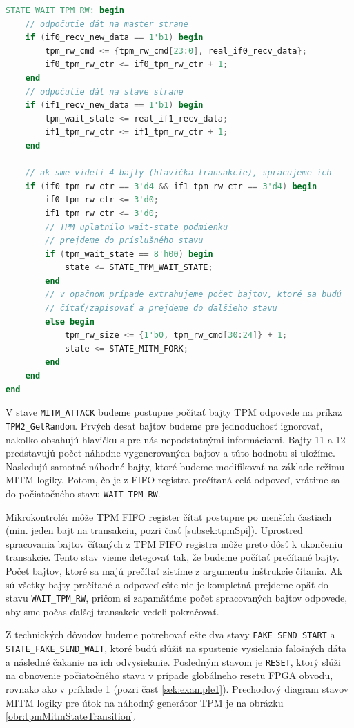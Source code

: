 \begin{lstlisting}[float,language=Verilog,caption={Logika stavu \texttt{WAIT\_TPM\_RW}.},label=snip:tpmRwState]
STATE_WAIT_TPM_RW: begin
    // odpočutie dát na master strane
    if (if0_recv_new_data == 1'b1) begin
        tpm_rw_cmd <= {tpm_rw_cmd[23:0], real_if0_recv_data};
        if0_tpm_rw_ctr <= if0_tpm_rw_ctr + 1;
    end
    // odpočutie dát na slave strane
    if (if1_recv_new_data == 1'b1) begin
        tpm_wait_state <= real_if1_recv_data;
        if1_tpm_rw_ctr <= if1_tpm_rw_ctr + 1;
    end
    
    // ak sme videli 4 bajty (hlavička transakcie), spracujeme ich
    if (if0_tpm_rw_ctr == 3'd4 && if1_tpm_rw_ctr == 3'd4) begin
        if0_tpm_rw_ctr <= 3'd0;
        if1_tpm_rw_ctr <= 3'd0;
        // TPM uplatnilo wait-state podmienku
        // prejdeme do príslušného stavu
        if (tpm_wait_state == 8'h00) begin
            state <= STATE_TPM_WAIT_STATE;
        end
        // v opačnom prípade extrahujeme počet bajtov, ktoré sa budú
        // čítať/zapisovať a prejdeme do ďalšieho stavu
        else begin
            tpm_rw_size <= {1'b0, tpm_rw_cmd[30:24]} + 1;
            state <= STATE_MITM_FORK;
        end
    end
end
\end{lstlisting}

V stave \texttt{MITM\_ATTACK} budeme postupne počítať bajty TPM odpovede na príkaz \texttt{TPM2\_GetRandom}. Prvých desať bajtov budeme pre jednoduchosť ignorovať, nakoľko obsahujú hlavičku s pre nás nepodstatnými informáciami. Bajty 11 a 12 predstavujú počet náhodne vygenerovaných bajtov a túto hodnotu si uložíme. Nasledujú samotné náhodné bajty, ktoré budeme modifikovať na základe režimu MITM logiky. Potom, čo je z FIFO registra prečítaná celá odpoveď, vrátime sa do počiatočného stavu \texttt{WAIT\_TPM\_RW}.

Mikrokontrolér môže TPM FIFO register čítať postupne po menších častiach (min. jeden bajt na transakciu, pozri časť \ref{subsek:tpmSpi}). Uprostred spracovania bajtov čítaných z TPM FIFO registra môže preto dôsť k ukončeniu transakcie. Tento stav vieme detegovať tak, že budeme počítať prečítané bajty. Počet bajtov, ktoré sa majú prečítať zistíme z argumentu inštrukcie čítania. Ak sú všetky bajty prečítané a odpoveď ešte nie je kompletná prejdeme opäť do stavu \texttt{WAIT\_TPM\_RW}, pričom si zapamätáme počet spracovaných bajtov odpovede, aby sme počas ďalšej transakcie vedeli pokračovať.

Z technických dôvodov budeme potrebovať ešte dva stavy \texttt{FAKE\_SEND\_START} a \texttt{STATE\_FAKE\_SEND\_WAIT}, ktoré budú slúžiť na spustenie vysielania falošných dáta a následné čakanie na ich odvysielanie. Posledným stavom je \texttt{RESET}, ktorý slúži na obnovenie počiatočného stavu v prípade globálneho resetu FPGA obvodu, rovnako ako v príklade 1 (pozri časť \ref{sek:example1}). Prechodový diagram stavov MITM logiky pre útok na náhodný generátor TPM je na obrázku \ref{obr:tpmMitmStateTransition}.

